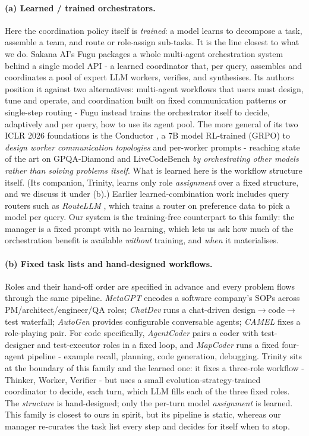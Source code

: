 \documentclass[11pt]{article}
\begin{document}
\paragraph{(a) Learned / trained orchestrators.}
Here the coordination policy itself is \textit{trained}: a model learns to decompose a
task, assemble a team, and route or role-assign sub-tasks. It is the line closest to what
we do. Sakana AI's Fugu \cite{sakana2026}
packages a whole multi-agent orchestration system behind a single model
API - a learned coordinator that, per query, assembles and coordinates a pool of expert
LLM workers, verifies, and synthesises. Its authors position it against two alternatives:
multi-agent workflows that users must design, tune and operate, and coordination built on
fixed communication patterns or single-step routing - Fugu instead trains the
orchestrator itself to decide, adaptively and per query, how to use its agent pool. The
more general of its two ICLR 2026 foundations is the Conductor
\cite{nielsen2025}, a 7B model RL-trained (GRPO) to \textit{design worker communication
topologies} and per-worker prompts - reaching state of the art on GPQA-Diamond and
LiveCodeBench \textit{by orchestrating other models rather than solving problems itself}.
What is learned here is the workflow structure itself. (Its companion, Trinity,
learns only role \textit{assignment} over a fixed structure, and we discuss it under (b).)
Earlier learned-combination work includes query routers such as \textit{RouteLLM}
\cite{ong2024}, which trains a router on preference data to pick a model per query.
Our system is the training-free counterpart to this family:
the manager is a fixed prompt with no learning, which lets us ask how much of the
orchestration benefit is available \textit{without} training, and \textit{when} it
materialises.

\paragraph{(b) Fixed task lists and hand-designed workflows.}
Roles and their hand-off order are specified in advance and every problem flows through
the same pipeline. \textit{MetaGPT} \cite{hong2023} encodes a
software company's SOPs across PM/architect/engineer/QA roles; \textit{ChatDev}
\cite{qian2023} runs a chat-driven design$\to$code$\to$test waterfall;
\textit{AutoGen} \cite{wu2023} provides configurable conversable
agents; \textit{CAMEL} \cite{li2023} fixes a role-playing pair. For
code specifically, \textit{AgentCoder} \cite{huang2023} pairs a
coder with test-designer and test-executor roles in a fixed loop, and \textit{MapCoder}
\cite{islam2024} runs a fixed four-agent pipeline - example
recall, planning, code generation, debugging. Trinity \cite{xu2025} sits at the
boundary of this family and the learned one: it fixes a
three-role workflow - Thinker, Worker, Verifier - but uses a small
evolution-strategy-trained coordinator to decide, each turn, which LLM fills each of the
three fixed roles. The \textit{structure} is hand-designed; only the per-turn model
\textit{assignment} is learned. This family is closest to ours in spirit, but its pipeline
is static, whereas our manager re-curates the task list every step and decides for itself
when to stop.
\end{document}
